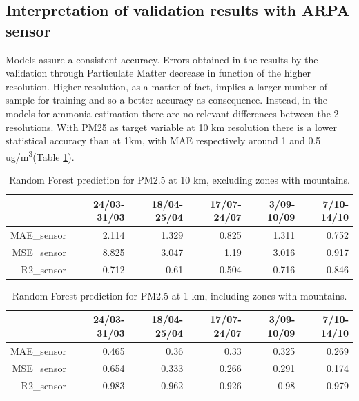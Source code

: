 \subsection{Interpretation of validation results with ARPA sensor}
Models assure a consistent accuracy.
Errors obtained in the results by the validation through Particulate Matter decrease in function of the higher resolution.
Higher resolution, as a matter of fact, implies a larger number of sample for training and so a better accuracy as consequence.
Instead, in the models for ammonia estimation there are no relevant differences between the 2 resolutions.
With PM25 as target variable at 10 km resolution there is a lower statistical accuracy than at 1km, with MAE respectively around 1 and 0.5 ug/m\textsuperscript{3}(Table \ref{tab:res1km}). 
\begin{table}[H]
\begin{tabular}{rrrrrr}
\hline
      &   24/03-31/03 &   18/04-25/04 &   17/07-24/07 &   3/09-10/09 &   7/10-14/10 \\
\hline
  MAE\_sensor   &            2.114 &            1.329 &            0.825 &            1.311 &            0.752 \\
  MSE\_sensor   &            8.825 &            3.047 &            1.19  &            3.016 &            0.917 \\
  R2\_sensor    &            0.712 &            0.61  &            0.504 &            0.716 &            0.846 \\
\hline
\end{tabular}
\caption{Random Forest prediction for PM2.5 at 10 km, excluding zones with mountains.}
\end{table}
\begin{table}[H]
\begin{tabular}{rrrrrr}
\hline
     &   24/03-31/03 &   18/04-25/04 &   17/07-24/07 &   3/09-10/09 &   7/10-14/10 \\
\hline
   MAE\_sensor   &            0.465 &            0.36  &            0.33  &            0.325 &            0.269 \\
  MSE\_sensor   &            0.654 &            0.333 &            0.266 &            0.291 &            0.174 \\
   R2\_sensor    &            0.983 &            0.962 &            0.926 &            0.98  &            0.979 \\
\hline
\end{tabular}
\caption{Random Forest prediction for PM2.5 at 1 km, including zones with mountains.}
\label{tab:res1km}
\end{table}

